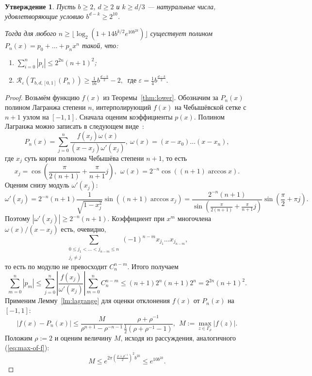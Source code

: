 \documentclass[3p]{cmmp}%
\newtheorem{proposition}{Утверждение}
\numberwithin{equation}{section}
\begin{document}
\begin{proposition}
	Пусть $b \ge 2$, $d \ge 2$ и $k \ge d/3$ --- натуральные числа, удовлетворяющие условию  $b^{d-k} \geq 2^{10}$.
	
	Тогда для любого $n \geq \lfloor\log_2(1 + 14b^{k/2}e^{10b^{2k}})\rfloor$ существует полином $P_n(x) = p_0 + \dots + p_nx^n$ такой, что:
	\begin{enumerate}
		\item $\sum_{i=0}^n|p_i| \leq 2^{2n}(n+1)^2$;
		\item\label{prop:2}
		$
		\mathcal{R}_\varepsilon(T_{b,d,[0,1]}(P_n)) \geq \frac{1}{16}b^{\frac{d-k}{2}} - 2,~\text{ где }\varepsilon = \frac{1}{4}b^{\frac{d-k}{2}}.
		$
	\end{enumerate}
\end{proposition}
\begin{proof}
	Возьмём функцию $f(x)$ из Теоремы~\ref{thm:lower}. Обозначим за $P_n(x)$ полином Лагранжа степени $n$, интерполирующий $f(x)$ на Чебышёвской сетке с $n+1$ узлом на $[-1,1]$.
	Сначала оценим коэффициенты $p(x)$. 
	Полином Лагранжа можно записать в следующем виде~\cite{MNA}:
	\[
	P_n(x) = \sum_{j=0}^{n} \frac{f(x_j)\omega(x)}{(x-x_j)\omega'(x_j)},~\omega(x) = (x - x_0)\dots(x-x_n),
	\]
	где $x_j$ суть корни полинома Чебышёва степени $n+1$, то есть 
	\[
	x_j = \cos\left(\frac{\pi}{2(n+1)} + \frac{\pi}{n+1}j\right),~~\omega(x) = 2^{-n}\cos((n+1)\arccos x).
	\]
	Оценим снизу модуль $\omega'(x_j)$:
	\[
	\omega'(x_j) = 2^{-n}(n+1)\frac{1}{\sqrt{1-x_j^2}}\sin\left((n+1)\arccos x_j\right) = \frac{2^{-n}(n+1)}{\sin\left(\frac{\pi}{2(n+1)} + \frac{\pi}{n+1}j\right)} \sin\left(\frac{\pi}{2} + \pi j\right).
	\]
	Поэтому $|\omega'(x_j)| \geq 2^{-n}(n+1)$.
	Коэффициент при $x^m$ многочлена $\omega(x)/(x-x_j)$ есть, очевидно, 
	\[
	\sum_{\substack{0\leq j_1 < \dots < j_{n-m} \leq n \\ j_{\ell} \neq j}} (-1)^{n-m}x_{j_1}\dots x_{j_{n-m}},
	\]
	то есть по модулю не превосходит $C_n^{n-m}$.
	Итого получаем
	\[
	\sum_{m=0}^n|p_m| \leq \sum_{j=0}^n\left|\frac{f(x_j)}{\omega'(x_j)}\right| \sum_{m=0}^nC_{n}^{n-m} \leq (n+1)2^n(n+1)2^n = 2^{2n}(n+1)^2.
	\]
	Применим Лемму~\ref{lm:lagrange} для оценки отклонения $f(x)$ от $P_n(x)$ на $[-1,1]$:
	\[
	|f(x) - P_n(x)| \leq \frac{M}{\rho^{n+1} - \rho^{-n-1}}\frac{\rho + \rho^{-1}}{\frac{1}{2}(\rho+ \rho^{-1}-1)},~~M :=  \max_{z\in\Gamma_\rho} |f(z)|.
	\]
	Положим $\rho := 2$ и оценим величину $M$, исходя из рассуждения, аналогичного (\ref{eq:max-of-f}): \[
	M \leq e^{2\pi\left(\frac{\rho + \rho^{-1}}{2}\right)^2b^{2k}} \leq e^{10 b^{2k}}.
\]
\end{proof}
\end{document}
